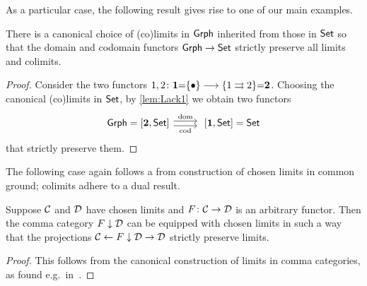 \documentclass{amsart}
\begin{document}
As a particular case, the following result gives rise to one of our main examples.
\begin{cor}
There is a canonical choice of (co)limits in $\mathsf{Grph}$ inherited from those in $\mathsf{Set}$ so that the domain and codomain functors $\mathsf{Grph}\to\mathsf{Set}$ strictly preserve all limits and colimits.
\end{cor}

\begin{proof}
 Consider the two functors $1,2\colon\mathbf{1}{=}\{\bullet\}\longrightarrow\{1\rightrightarrows2\}{=}\mathbf{2}$. Choosing the canonical (co)limits in $\mathsf{Set}$, by \cref{lem:Lack1} we obtain two functors
\begin{displaymath}
\begin{tikzcd}
 \Grph=[\two,\Set]\ar[r,shift left,"\mathrm{dom}"]\ar[r,shift right,"\mathrm{cod}"'] & \;[\one,\Set]=\Set
 \end{tikzcd}
\end{displaymath}
that strictly preserve them.
\end{proof}

The following case again follows a from construction of chosen limits in common ground; colimits adhere to a dual result.
\begin{lem}
Suppose $\mathcal{C}$ and $\mathcal{D}$ have chosen limits and $F\colon\mathcal{C}\to\mathcal{D}$ is an arbitrary functor. Then the comma category $F\downarrow\mathcal{D}$ can be equipped with chosen limits in such a way that the projections $\mathcal{C}\leftarrow F\downarrow\mathcal{D}\to\mathcal{D}$ strictly preserve limits.
\end{lem}

\begin{proof}
 This follows from the canonical construction of limits in comma categories, as found e.g.\ in~\cite[\S 2.16]{Handbook1}.
\end{proof}
\end{document}
